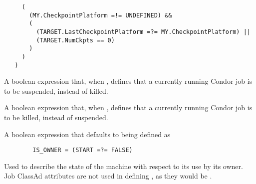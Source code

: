 \begin{description}
\begin{verbatim}
     (
       (MY.CheckpointPlatform =!= UNDEFINED) &&
       (
         (TARGET.LastCheckpointPlatform =?= MY.CheckpointPlatform) ||
         (TARGET.NumCkpts == 0)
       )
     )
   )
   \end{verbatim}
   \normalsize

\item[\Macro{WANT\_SUSPEND}] \label{param:WantSuspend}  A boolean expression
   that, when , defines that a currently running
   Condor job is to be suspended, instead of killed.

\item[\Macro{WANT\_VACATE}] \label{param:WantVacate}  A boolean expression
   that, when , defines that a currently running
   Condor job is to be killed, instead of suspended.

\item[\Macro{IS\_OWNER}] \label{param:IsOwner}  A boolean expression that
   defaults to being defined as
\begin{verbatim}
        IS_OWNER = (START =?= FALSE)
\end{verbatim}
   Used to describe the state of the machine with respect to its use
   by its owner.
   Job ClassAd attributes are not used in defining ,
   as they would be .
\end{description}




